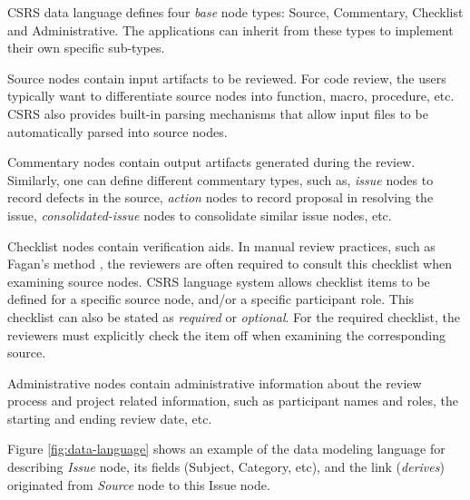 CSRS data language defines four {\it base} node
types: Source, Commentary, Checklist and Administrative. The
applications can inherit from these types to implement their own
specific sub-types.

Source nodes contain input artifacts to be reviewed. For code review,
the users typically want to differentiate source nodes into function,
macro, procedure, etc.  CSRS also provides built-in parsing mechanisms
that allow input files to be automatically parsed into source nodes. 

Commentary nodes contain output artifacts generated during the
review. Similarly, one can define different commentary types,
such as, {\it issue} nodes to record defects in the source,
{\it action} nodes to record proposal in resolving the issue, 
{\it consolidated-issue} nodes to consolidate similar issue nodes, etc.

Checklist nodes contain verification aids. In manual review practices,
such as Fagan's method \cite{Fagan76}, the reviewers are often required
to consult this checklist when examining source nodes. CSRS language
system allows checklist items to be defined for a specific source
node, and/or a specific participant role.
This checklist can also be stated as {\it required} or {\it optional}. 
For the required checklist, the reviewers
must explicitly check the item off when examining the corresponding
source. 

Administrative nodes contain administrative information about the
review process and project related information, such as participant names
and roles, the starting and ending review date, etc.

Figure \ref{fig:data-language} 
shows an example of the data modeling language for describing
{\sl Issue} node, its fields (Subject, Category, etc),
and the link ({\sl derives}) originated from {\sl Source} node to this
Issue node. 

